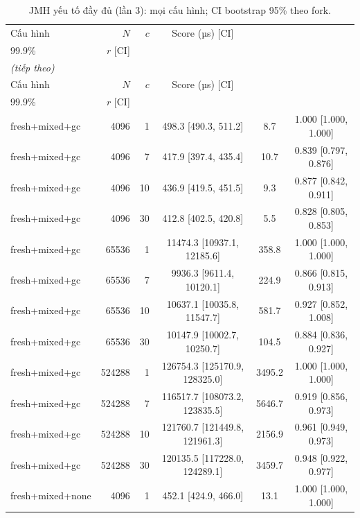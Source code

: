 \footnotesize
\begin{longtable}{lrrccc}
\caption{JMH yếu tố đầy đủ (lần 3): mọi cấu hình; CI bootstrap 95\% theo fork.}\label{tab:jmh_full}\\
\toprule
Cấu hình & $N$ & $c$ & Score (µs) [CI] & \makecell{{Score Error} \\ {99.9\%}} & $r$ [CI] \\
\midrule
\endfirsthead
\multicolumn{6}{l}{\textit{(tiếp theo)}}\\
\toprule
Cấu hình & $N$ & $c$ & Score (µs) [CI] & \makecell{{Score Error} \\ {99.9\%}} & $r$ [CI] \\
\midrule
\endhead
\bottomrule
\endlastfoot
fresh+mixed+gc & 4096 & 1 & 498.3 [490.3, 511.2] & 8.7 & 1.000 [1.000, 1.000] \\
fresh+mixed+gc & 4096 & 7 & 417.9 [397.4, 435.4] & 10.7 & 0.839 [0.797, 0.876] \\
fresh+mixed+gc & 4096 & 10 & 436.9 [419.5, 451.5] & 9.3 & 0.877 [0.842, 0.911] \\
fresh+mixed+gc & 4096 & 30 & 412.8 [402.5, 420.8] & 5.5 & 0.828 [0.805, 0.853] \\
fresh+mixed+gc & 65536 & 1 & 11474.3 [10937.1, 12185.6] & 358.8 & 1.000 [1.000, 1.000] \\
fresh+mixed+gc & 65536 & 7 & 9936.3 [9611.4, 10120.1] & 224.9 & 0.866 [0.815, 0.913] \\
fresh+mixed+gc & 65536 & 10 & 10637.1 [10035.8, 11547.7] & 581.7 & 0.927 [0.852, 1.008] \\
fresh+mixed+gc & 65536 & 30 & 10147.9 [10002.7, 10250.7] & 104.5 & 0.884 [0.836, 0.927] \\
fresh+mixed+gc & 524288 & 1 & 126754.3 [125170.9, 128325.0] & 3495.2 & 1.000 [1.000, 1.000] \\
fresh+mixed+gc & 524288 & 7 & 116517.7 [108073.2, 123835.5] & 5646.7 & 0.919 [0.856, 0.973] \\
fresh+mixed+gc & 524288 & 10 & 121760.7 [121449.8, 121961.3] & 2156.9 & 0.961 [0.949, 0.973] \\
fresh+mixed+gc & 524288 & 30 & 120135.5 [117228.0, 124289.1] & 3459.7 & 0.948 [0.922, 0.977] \\
fresh+mixed+none & 4096 & 1 & 452.1 [424.9, 466.0] & 13.1 & 1.000 [1.000, 1.000] \\

\end{longtable}
